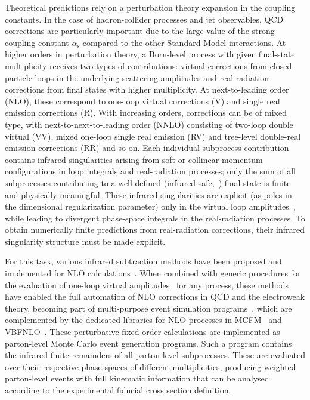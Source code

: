 \documentclass{SciPost}
\DeclareRobustCommand{\ensuremathrm}[1]{\ensuremath{\mathrm{#1}}}
\DeclareRobustCommand{\rs}{\ensuremathrm{s}}
\DeclareRobustCommand{\alphas}{\ensuremath{\alpha_\rs}}
\begin{document}
Theoretical predictions rely on a perturbation theory expansion in the coupling constants. In the case
of hadron-collider processes and jet observables, QCD corrections are particularly important due to
the large value of the strong coupling constant $\alphas$ compared to the other Standard Model interactions.
At higher orders in perturbation theory, a Born-level process
with given final-state multiplicity receives two types of contributions: virtual
corrections from closed particle loops in the underlying scattering amplitudes and real-radiation corrections from
final states with higher multiplicity. At next-to-leading order (NLO), these correspond to one-loop virtual corrections (V)
and single real emission corrections (R). With increasing orders, corrections can be of mixed type, with
next-to-next-to-leading order (NNLO) consisting of two-loop double virtual (VV), mixed one-loop single real emission
(RV) and tree-level double-real emission corrections (RR) and so on.
Each individual subprocess contribution contains infrared singularities arising from soft or collinear momentum
configurations in loop integrals and real-radiation processes; only the sum
of all subprocesses contributing to a well-defined (infrared-safe,~\cite{Sterman:1977wj})
final state is finite and physically meaningful.
These infrared singularities are explicit (as poles in
the dimensional regularization parameter) only in the virtual loop amplitudes~\cite{Catani:1998bh,Becher:2009cu,Gardi:2009qi,Dixon:2009gx},
 while leading to divergent
phase-space integrals in the real-radiation processes. To obtain numerically finite
predictions from real-radiation corrections, their infrared singularity structure must be made explicit.

For this task, various
infrared subtraction methods have been proposed and implemented for NLO calculations~\cite{Giele:1993dj,Catani:1996vz,Frixione:1995ms}. When combined with generic procedures for
the evaluation
of one-loop virtual amplitudes~\cite{Ossola:2007ax,Ellis:2011cr,Cascioli:2011va,GoSam:2014iqq} for any
process, these methods have enabled the full automation of NLO corrections in QCD and the electroweak theory,
becoming part of
multi-purpose event simulation programs~\cite{Alioli:2010xd,Alwall:2014hca,Bellm:2015jjp,Sherpa:2019gpd,Bierlich:2022pfr}, which are complemented
by the dedicated libraries for NLO processes in \textsc{MCFM}~\cite{Campbell:2019dru} and \textsc{VBFNLO}~\cite{Arnold:2008rz}.
These perturbative fixed-order calculations are implemented as parton-level Monte Carlo event generation programs. Such a program contains
 the infrared-finite remainders of all parton-level subprocesses. These
are evaluated over their respective phase spaces of different multiplicities, producing weighted parton-level events
with full kinematic information that can be analysed according to the experimental fiducial cross section definition.
\end{document}
